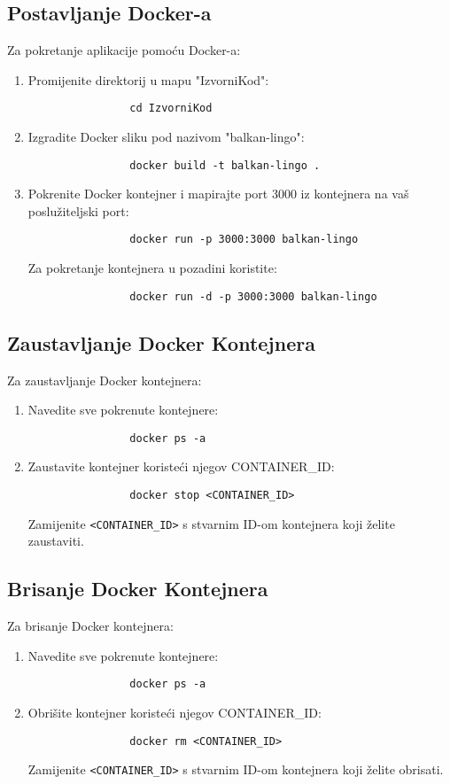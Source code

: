 		\subsection*{Postavljanje Docker-a}
		Za pokretanje aplikacije pomoću Docker-a:
		\begin{enumerate}
			\item Promijenite direktorij u mapu "IzvorniKod":
			\begin{verbatim}
				cd IzvorniKod
			\end{verbatim}
			\item Izgradite Docker sliku pod nazivom "balkan-lingo":
			\begin{verbatim}
				docker build -t balkan-lingo .
			\end{verbatim}
			\item Pokrenite Docker kontejner i mapirajte port 3000 iz kontejnera na vaš poslužiteljski port:
			\begin{verbatim}
				docker run -p 3000:3000 balkan-lingo
			\end{verbatim}
			Za pokretanje kontejnera u pozadini koristite:
			\begin{verbatim}
				docker run -d -p 3000:3000 balkan-lingo
			\end{verbatim}
		\end{enumerate}
		
		\subsection*{Zaustavljanje Docker Kontejnera}
		Za zaustavljanje Docker kontejnera:
		\begin{enumerate}
			\item Navedite sve pokrenute kontejnere:
			\begin{verbatim}
				docker ps -a
			\end{verbatim}
			\item Zaustavite kontejner koristeći njegov CONTAINER\_ID:
			\begin{verbatim}
				docker stop <CONTAINER_ID>
			\end{verbatim}
			Zamijenite \texttt{<CONTAINER\_ID>} s stvarnim ID-om kontejnera koji želite zaustaviti.
		\end{enumerate}

		\subsection*{Brisanje Docker Kontejnera}
		Za brisanje Docker kontejnera:
		\begin{enumerate}
			\item Navedite sve pokrenute kontejnere:
			\begin{verbatim}
				docker ps -a
			\end{verbatim}
			\item Obrišite kontejner koristeći njegov CONTAINER\_ID:
			\begin{verbatim}
				docker rm <CONTAINER_ID>
			\end{verbatim}
			Zamijenite \texttt{<CONTAINER\_ID>} s stvarnim ID-om kontejnera koji želite obrisati.
		\end{enumerate}

